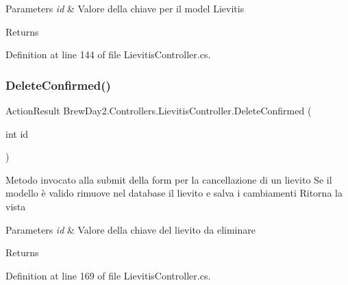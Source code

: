 \begin{DoxyParams}{Parameters}
{\em id} & Valore della chiave per il model Lievitis\\
\hline
\end{DoxyParams}
\begin{DoxyReturn}{Returns}

\end{DoxyReturn}


Definition at line 144 of file Lievitis\+Controller.\+cs.

\mbox{\label{class_brew_day2_1_1_controllers_1_1_lievitis_controller_aaf3d7c0184c52dd5e7884c70867d59c0}} 
\subsubsection{\texorpdfstring{Delete\+Confirmed()}{DeleteConfirmed()}}
{\footnotesize\ttfamily Action\+Result Brew\+Day2.\+Controllers.\+Lievitis\+Controller.\+Delete\+Confirmed (\begin{DoxyParamCaption}\item[{int}]{id }\end{DoxyParamCaption})}



Metodo invocato alla submit della form per la cancellazione di un lievito Se il modello è valido rimuove nel database il lievito e salva i cambiamenti Ritorna la vista 


\begin{DoxyParams}{Parameters}
{\em id} & Valore della chiave del lievito da eliminare\\
\hline
\end{DoxyParams}
\begin{DoxyReturn}{Returns}

\end{DoxyReturn}


Definition at line 169 of file Lievitis\+Controller.\+cs.

\mbox{\label{class_brew_day2_1_1_controllers_1_1_lievitis_controller_ab756f4407e24098c221bf07b9d18dd47}} 
